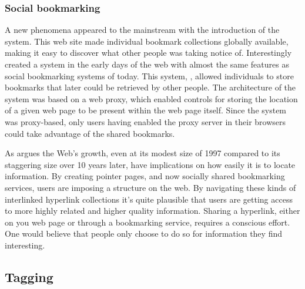 \subsubsection{Social bookmarking}

A new phenomena appeared to the mainstream with the introduction of the
 system. This web site made individual
bookmark collections globally available, making it easy to discover what other
people was taking notice of. Interestingly \citet{keller97} created a system
in the early days of the web with almost the same features as social
bookmarking systems of today. This system, , allowed
individuals to store bookmarks that later could be retrieved by other people.
The architecture of the system was based on a web proxy, which enabled
controls for storing the location of a given web page to be present within the
web page itself. Since the system was proxy-based, only users having enabled
the proxy server in their browsers could take advantage of the shared
bookmarks.

As \citet[]{dieberger97} argues the Web's growth, even at its modest
size of 1997 compared to its staggering size over 10 years later, have
implications on how easily it is to locate information. By creating pointer
pages, and now socially shared bookmarking services, users are imposing a
structure on the web. By navigating these kinds of interlinked hyperlink
collections it's quite plausible that users are getting access to more highly
related and higher quality information. Sharing a hyperlink, either on you web
page or through a bookmarking service, requires a conscious effort. One would
believe that people only choose to do so for information they find
interesting.

\subsection{Tagging}

